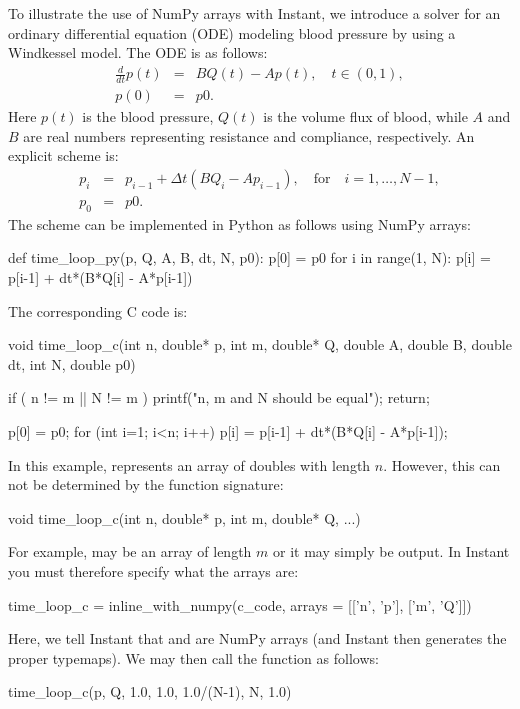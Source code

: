 To illustrate the use of NumPy arrays with Instant, we introduce a
solver for an ordinary differential equation (ODE) modeling blood pressure by
using a Windkessel model. The ODE is as follows:
\begin{eqnarray}
\frac{d}{dt}p(t) &=& B Q(t) - A p(t), \quad t \in (0,1), \\
p(0) &=& p0.
\end{eqnarray}
Here $p(t)$ is the blood pressure, $Q(t)$ is the volume flux of blood,
while $A$ and $B$ are real numbers representing resistance and compliance, respectively.
An explicit scheme is:
\begin{eqnarray}
p_i &=& p_{i-1} + \Delta t (B Q_i - A p_{i-1}), \quad \mbox{for}\quad i=1,\ldots,N-1,  \\
p_0 &=& p0.
\end{eqnarray}
The scheme can be implemented in Python as follows using NumPy arrays:
\begin{python}
def time_loop_py(p, Q, A, B, dt, N, p0):
    p[0] = p0
    for i in range(1, N):
        p[i] = p[i-1] + dt*(B*Q[i] - A*p[i-1])
\end{python}
The corresponding C code is: 
\begin{python}
void time_loop_c(int n, double* p,
                 int m, double* Q,
                 double A, double B,
                 double dt, int N, double p0)
{
    if ( n != m || N != m )
    {
        printf("n, m and N should be equal\n");
        return;
    }

    p[0] = p0;
    for (int i=1; i<n; i++)
    {
        p[i] = p[i-1] + dt*(B*Q[i] - A*p[i-1]);
    }
}
\end{python}
In this example,  represents an array of doubles with
length $n$. However, this can not be determined by the function signature:
\begin{python}
void time_loop_c(int n, double* p, int m, double* Q, ...)
\end{python}
For example,  may be an array of length $m$ or it may simply be
output. In Instant you must therefore specify what the arrays are:
\begin{python}
time_loop_c = inline_with_numpy(c_code,
                                arrays = [['n', 'p'],
                                          ['m', 'Q']])
\end{python}
Here, we tell Instant that  and
 are NumPy arrays (and Instant then generates the  
proper typemaps).
We may then call the 
function as follows:
\begin{python}
time_loop_c(p, Q, 1.0, 1.0, 1.0/(N-1), N, 1.0)
\end{python}

